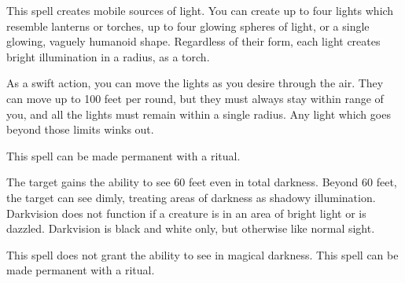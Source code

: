 \begin{spellheader}
    \spelldur{\durshort \dismissable}
\end{spellheader}
\begin{spelleffects}
    \spelleffect This spell creates mobile sources of light. You can create up to four lights which resemble lanterns or torches, up to four glowing spheres of light, or a single glowing, vaguely humanoid shape. Regardless of their form, each light creates bright illumination in a \areamed radius, as a torch.

    As a swift action, you can move the lights as you desire through the air. They can move up to 100 feet per round, but they must always stay within range of you, and all the lights must remain within a single \areamed radius. Any light which goes beyond those limits winks out.
\end{spelleffects}
\begin{spellfooter}
    \spellnotes This spell can be made permanent with a  ritual.
\end{spellfooter}

\begin{spellheader}
    \spellrng{\rngtouch}
    \spelldur{\durlong}
\end{spellheader}
\begin{spelleffects}
    \spelleffect The target gains the ability to see 60 feet even in total darkness. Beyond 60 feet, the target can see dimly, treating areas of darkness as shadowy illumination. Darkvision does not function if a creature is in an area of bright light or is dazzled. Darkvision is black and white only, but otherwise like normal sight.
\end{spelleffects}
\begin{spellfooter}
    \spellnotes This spell does not grant the ability to see in magical darkness. This spell can be made permanent with a  ritual.
\end{spellfooter}


